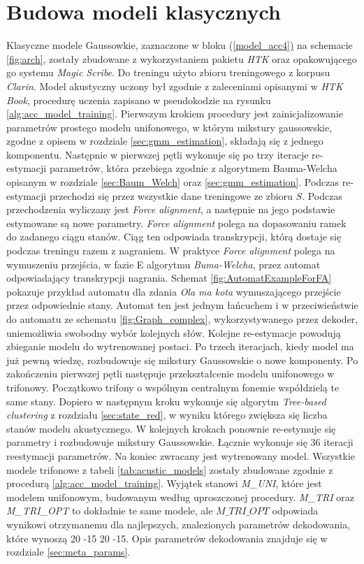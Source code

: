 \documentclass[shortabstract, mgr]{iithesis}
\newcommand{\refBlock}[1]{(\hyperref[#1]{\ref*{#1})}
}
\begin{document}
	\section{Budowa modeli klasycznych}
		Klasyczne modele Gaussowkie, zaznaczone w bloku \refBlock{model_acc4} na schemacie \ref{fig:arch}, zostały zbudowane z wykorzystaniem pakietu \textit{HTK} oraz opakowującego go systemu \textit{Magic Scribe}. Do treningu użyto zbioru treningowego z korpusu \textit{Clarin}. Model akustyczny uczony był zgodnie z zaleceniami opisanymi w \textit{HTK Book}\cite{htkbook}, procedurę uczenia zapisano w pseudokodzie na rysunku \ref{alg:acc_model_training}. Pierwszym krokiem procedury jest zainicjalizowanie parametrów prostego modelu unifonowego, w którym mikstury gaussowskie, zgodne z opisem w rozdziale \ref{sec:gmm_estimation}, składają się z jednego komponentu. Następnie w pierwszej pętli wykonuje się po trzy iteracje re-estymacji parametrów, która przebiega zgodnie z algorytmem Bauma-Welcha opisanym w rozdziale \ref{sec:Baum_Welch} oraz \ref{sec:gmm_estimation}. Podczas re-estymacji przechodzi się przez wszystkie dane treningowe ze zbioru $S$. Podczas przechodzenia wyliczany jest \textit{Force alignment}, a następnie na jego podstawie estymowane są nowe parametry. \textit{Force alignment} polega na dopasowaniu ramek do zadanego ciągu stanów. Ciąg ten odpowiada transkrypcji, którą dostaje się podczas treningu razem z nagraniem. W praktyce \textit{Force alignment} polega na wymuszeniu przejścia, w fazie E algorytmu \textit{Buma-Welcha}, przez automat odpowiadający transkrypcji nagrania. Schemat \ref{fig:AutomatExampleForFA} pokazuje przykład automatu dla zdania \textit{Ola ma kota} wymuszającego przejście przez odpowiednie stany. Automat ten jest jednym łańcuchem i w przeciwieństwie do automatu ze schematu \ref{fig:Graph_complex}, wykorzystywanego przez dekoder, uniemożliwia swobodny wybór kolejnych słów. Kolejne re-estymacje powodują zbieganie modelu do wytrenowanej postaci. Po trzech iteracjach, kiedy model ma już pewną wiedzę, rozbudowuje się mikstury Gaussowskie o nowe komponenty. Po zakończeniu pierwszej pętli następuje przekształcenie modelu unifonowego w trifonowy. Początkowo trifony o wspólnym centralnym fonemie współdzielą te same stany. Dopiero w następnym kroku wykonuje się algorytm \textit{Tree-based clustering} z rozdziału \ref{sec:state_red}, w wyniku którego zwiększa się liczba stanów modelu akustycznego. W kolejnych krokach ponownie re-estymuje się parametry i rozbudowuje mikstury Gaussowskie. Łącznie wykonuje się $36$ iteracji reestymacji parametrów. Na koniec zwracany jest wytrenowany model. Wszystkie modele trifonowe z tabeli \ref{tab:acustic_models} zostały zbudowane zgodnie z procedurą \ref{alg:acc_model_training}. Wyjątek stanowi \textit{M\_UNI}, które jest modelem unifonowym, budowanym według uproszczonej procedury. \textit{M\_TRI} oraz \textit{M\_TRI\_OPT} to dokładnie te same modele, ale $M\_TRI\_OPT$ odpowiada wynikowi otrzymanemu dla najlepszych, znalezionych parametrów dekodowania, które wynoszą 20 -15 20 -15. Opis parametrów dekodowania znajduje się w rozdziale \ref{sec:meta_params}.
		
\end{document}
